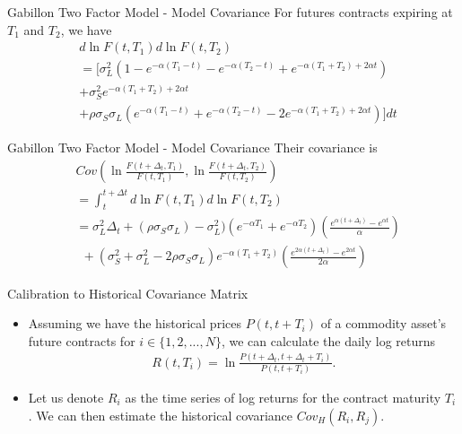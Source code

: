 \documentclass[11pt]{beamer}
\begin{document}
\begin{frame}{Gabillon Two Factor Model - Model Covariance}
For futures contracts expiring at $T_1$ and $T_2$, we have
\begin{align*}
& d\ln F(t, T_1) d\ln F(t, T_2) \\
& = [\sigma_L^2(1-e^{-\alpha(T_1-t)} - e^{-\alpha(T_2-t)} + e^{-\alpha(T_1+T_2)+2\alpha t}) \\
& + \sigma_S^2 e^{-\alpha(T_1+T_2) + 2\alpha t} \\
& +\rho \sigma_S\sigma_L(e^{-\alpha(T_1-t)} + e^{-\alpha(T_2-t)} - 2e^{-\alpha(T_1+T_2)+2\alpha t}) ] dt
\end{align*}

\end{frame}

\begin{frame}{Gabillon Two Factor Model - Model Covariance}
Their covariance is 
\begin{align*}
&Cov\left(\ln\frac{F(t+\Delta_t, T_1)}{F(t, T_1)}, \ln\frac{F(t+\Delta_t, T_2)}{F(t, T_2)}\right) \\
&= \int_t^{t+\Delta t} d\ln F(t, T_1) d\ln F(t, T_2) \\
&= \sigma_L^2\Delta_t + (\rho\sigma_S\sigma_L) - \sigma_L^2)(e^{-\alpha T_1} + e^{-\alpha T_2})\left(\frac{e^{\alpha(t+\Delta_t)} - e^{\alpha t}}{\alpha}\right) \\
&~~+ (\sigma_S^2+\sigma_L^2 - 2\rho\sigma_S\sigma_L)e^{-\alpha(T_1+T_2)}\left(\frac{e^{2\alpha(t+\Delta_t)} - e^{2\alpha t}}{2\alpha}\right)
\end{align*}

\end{frame}

\begin{frame}{Calibration to Historical Covariance Matrix}
\begin{itemize}
\item Assuming we have the historical prices $P(t, t+T_i)$ of a commodity asset's future contracts for $i \in \{1, 2, ..., N\}$,
we can calculate the daily log returns
\begin{align*}
R(t, T_i) = \ln \frac{P(t+\Delta_t, t+\Delta_t + T_i)}{P(t, t+T_i)}.
\end{align*}
\item Let us denote $R_i$ as the time series of log returns for the contract maturity $T_i$.
We can then estimate the historical covariance $Cov_H (R_i, R_j)$.
\end{itemize}

\end{frame}
\end{document}
